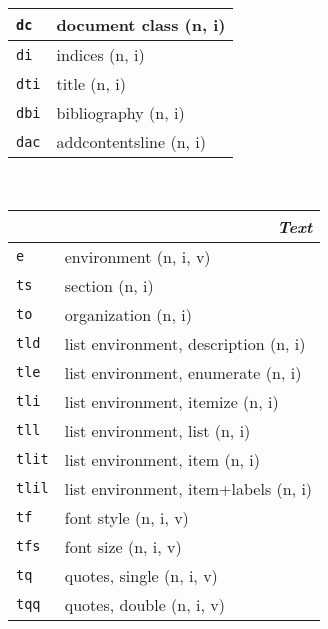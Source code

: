 \documentclass[oneside,10pt,landscape,DIV17]{scrartcl}
\newcommand{\Map}[1] {\textbf{\textasciiacute}\texttt{#1}}
\begin{document}
\begin{multicols}{3}
\begin{center}
\begin{tabular}[]{|p{11mm}|p{60mm}|}
\hline     \Map{dc}  &  document class              \hfill (n, i)\\
\hline     \Map{di}  &  indices                     \hfill (n, i)\\
\hline     \Map{dti} &  title                       \hfill (n, i)\\
\hline     \Map{dbi} &  bibliography                \hfill (n, i)\\
\hline     \Map{dac} &  addcontentsline             \hfill (n, i)\\
\hline
%
\end{tabular}\\
%
\begin{tabular}[]{|p{11mm}|p{60mm}|}
\hline
\multicolumn{2}{|r|}{\textsl{\textbf{T}ext}}                 \\[1.0ex]
\hline \Map{e}    & environment                    \hfill (n, i, v)\\
\hline \Map{ts}   & section                        \hfill (n, i)\\
\hline \Map{to}   & organization                   \hfill (n, i)\\
\hline \Map{tld}  & list environment, description  \hfill (n, i)\\
\hline \Map{tle}  & list environment, enumerate    \hfill (n, i)\\
\hline \Map{tli}  & list environment, itemize      \hfill (n, i)\\
\hline \Map{tll}  & list environment, list         \hfill (n, i)\\
\hline \Map{tlit} & list environment, item         \hfill (n, i)\\
\hline \Map{tlil} & list environment, item+labels  \hfill (n, i)\\
\hline \Map{tf}   & font style                     \hfill (n, i, v)\\
\hline \Map{tfs}  & font size                      \hfill (n, i, v)\\
\hline \Map{tq}   & quotes, single                 \hfill (n, i, v)\\
\hline \Map{tqq}  & quotes, double                 \hfill (n, i, v)\\

\end{tabular}
\end{center}
\end{multicols}
\end{document}
